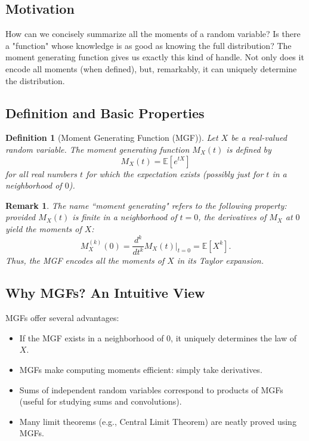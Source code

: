 \documentclass[12pt]{article}
\newtheorem{definition}[theorem]{Definition}
\newtheorem{remark}[theorem]{Remark}
\begin{document}
\subsection{Motivation}
How can we concisely summarize all the moments of a random variable? Is there a "function" whose knowledge is as good as knowing the full distribution? The moment generating function gives us exactly this kind of handle. Not only does it encode all moments (when defined), but, remarkably, it can uniquely determine the distribution.

\subsection{Definition and Basic Properties}

\begin{definition}[Moment Generating Function (MGF)]
    Let $X$ be a real-valued random variable. The \emph{moment generating function} $M_X(t)$ is defined by
    \[
        M_X(t) = \mathbb{E}\left[e^{tX}\right]
    \]
    for all real numbers $t$ for which the expectation exists (possibly just for $t$ in a neighborhood of $0$).
\end{definition}

\begin{remark}
    The name ``moment generating" refers to the following property: provided $M_X(t)$ is finite in a neighborhood of $t=0$, the derivatives of $M_X$ at $0$ yield the moments of $X$:
    \[
        M_X^{(k)}(0) = \frac{d^k}{dt^k} M_X(t) \Big|_{t=0} = \mathbb{E}[X^k].
    \]
    Thus, the MGF encodes \emph{all} the moments of $X$ in its Taylor expansion.
\end{remark}

\subsection{Why MGFs? An Intuitive View}
MGFs offer several advantages:
\begin{itemize}
    \item If the MGF exists in a neighborhood of $0$, it uniquely determines the law of $X$.
    \item MGFs make computing moments efficient: simply take derivatives.
    \item Sums of independent random variables correspond to products of MGFs (useful for studying sums and convolutions).
    \item Many limit theorems (e.g., Central Limit Theorem) are neatly proved using MGFs.
\end{itemize}
\end{document}
